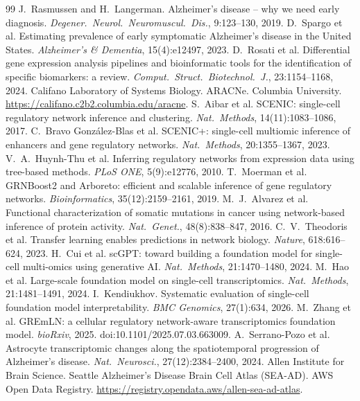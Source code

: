 \documentclass[10pt,twocolumn,letterpaper]{article}
\begin{document}
{\small
\begin{thebibliography}{99}\setlength{\itemsep}{0pt}
 J.~Rasmussen and H.~Langerman. Alzheimer's disease -- why we need early diagnosis. \emph{Degener.\ Neurol.\ Neuromuscul.\ Dis.}, 9:123--130, 2019.
 D.~Spargo et al. Estimating prevalence of early symptomatic Alzheimer's disease in the United States. \emph{Alzheimer's \& Dementia}, 15(4):e12497, 2023.
 D.~Rosati et al. Differential gene expression analysis pipelines and bioinformatic tools for the identification of specific biomarkers: a review. \emph{Comput.\ Struct.\ Biotechnol.\ J.}, 23:1154--1168, 2024.
 Califano Laboratory of Systems Biology. ARACNe. Columbia University. \url{https://califano.c2b2.columbia.edu/aracne}.
 S.~Aibar et al. SCENIC: single-cell regulatory network inference and clustering. \emph{Nat.\ Methods}, 14(11):1083--1086, 2017.
 C.~Bravo Gonz\'alez-Blas et al. SCENIC+: single-cell multiomic inference of enhancers and gene regulatory networks. \emph{Nat.\ Methods}, 20:1355--1367, 2023.
 V.~A.~Huynh-Thu et al. Inferring regulatory networks from expression data using tree-based methods. \emph{PLoS ONE}, 5(9):e12776, 2010.
 T.~Moerman et al. GRNBoost2 and Arboreto: efficient and scalable inference of gene regulatory networks. \emph{Bioinformatics}, 35(12):2159--2161, 2019.
 M.~J.~Alvarez et al. Functional characterization of somatic mutations in cancer using network-based inference of protein activity. \emph{Nat.\ Genet.}, 48(8):838--847, 2016.
 C.~V.~Theodoris et al. Transfer learning enables predictions in network biology. \emph{Nature}, 618:616--624, 2023.
 H.~Cui et al. scGPT: toward building a foundation model for single-cell multi-omics using generative AI. \emph{Nat.\ Methods}, 21:1470--1480, 2024.
 M.~Hao et al. Large-scale foundation model on single-cell transcriptomics. \emph{Nat.\ Methods}, 21:1481--1491, 2024.
 I.~Kendiukhov. Systematic evaluation of single-cell foundation model interpretability. \emph{BMC Genomics}, 27(1):634, 2026.
 M.~Zhang et al. GREmLN: a cellular regulatory network-aware transcriptomics foundation model. \emph{bioRxiv}, 2025. doi:10.1101/2025.07.03.663009.
 A.~Serrano-Pozo et al. Astrocyte transcriptomic changes along the spatiotemporal progression of Alzheimer's disease. \emph{Nat.\ Neurosci.}, 27(12):2384--2400, 2024.
 Allen Institute for Brain Science. Seattle Alzheimer's Disease Brain Cell Atlas (SEA-AD). AWS Open Data Registry. \url{https://registry.opendata.aws/allen-sea-ad-atlas}.

\end{thebibliography}}
\end{document}
